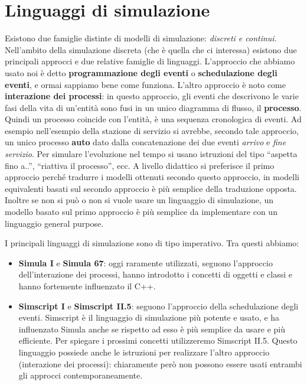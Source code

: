 \documentclass[11pt]{book}
\begin{document}
\section{Linguaggi di simulazione}
Esistono due famiglie distinte di modelli di simulazione: {\em
  discreti e continui}. Nell'ambito della simulazione discreta (che \`e
quella che ci interessa) esistono due principali approcci e due
relative famiglie di linguaggi. L'approccio che abbiamo usato noi \`e
detto {\bf programmazione degli eventi} o {\bf schedulazione degli
  eventi}, e ormai sappiamo bene come funziona. L'altro approccio \`e
noto come {\bf interazione dei processi}: in questo approccio, gli
eventi che descrivono le varie fasi della vita di un'entit\`a sono fusi
in un unico diagramma di flusso, il {\bf processo}. Quindi un processo
coincide con l'entit\`a, \`e una sequenza cronologica di eventi. Ad
esempio nell'esempio della stazione di servizio si avrebbe, secondo
tale approccio, un unico processo {\bf auto} dato dalla concatenazione
dei due eventi {\em arrivo} e {\em fine servizio}. Per simulare
l'evoluzione nel tempo si usano istruzioni del tipo ``aspetta fino
a..'', ``riattiva il processo'', ecc. A livello didattico si
preferisce il primo approccio perch\'e tradurre i modelli ottenuti
secondo questo approccio, in modelli equivalenti basati sul secondo
approccio \`e pi\`u semplice della traduzione opposta. Inoltre se non si
pu\`o o non si vuole usare un linguaggio di simulazione, un modello
basato sul primo approccio \`e pi\`u semplice da implementare con un
linguaggio general purpose.

I principali linguaggi di simulazione sono di tipo imperativo. Tra
questi abbiamo:

\begin{itemize} 
\item {\bf Simula I} e {\bf Simula 67}: oggi raramente utilizzati,
  seguono l'approccio dell'interazione dei processi, hanno introdotto
  i concetti di oggetti e classi e hanno fortemente influenzato il
  C++.
\item {\bf Simscript I} e {\bf Simscript II.5}: seguono l'approccio
  della schedulazione degli eventi. Simscript \`e il linguaggio di
  simulazione pi\`u potente e usato, e ha influenzato Simula anche se
  rispetto ad esso \`e pi\`u semplice da usare e pi\`u efficiente.  Per
  spiegare i prossimi concetti utilizzeremo Simscript II.5. Questo
  linguaggio possiede anche le istruzioni per realizzare l'altro
  approccio (interazione dei processi): chiaramente per\`o non possono
  essere usati entrambi gli approcci contemporaneamente.
\end{itemize}
\end{document}
